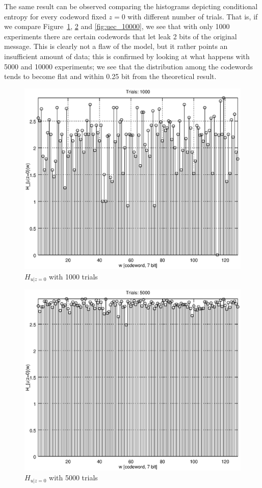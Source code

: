 \documentclass[a4paper,12pt,titlepage]{article}
\begin{document}
The same result can be observed comparing the histograms depicting conditional
entropy for every codeword fixed $z=0$ with different number of trials. That
is, if we compare Figure~\ref{fig:uec_1000}, \ref{fig:uec_5000} and
\ref{fig:uec_10000}, we see that with only 1000 experiments there are certain
codewords that let leak 2 bits of the original message. This is clearly not a
flaw of the model, but it rather points an insufficient amount of data; this is
confirmed by looking at what happens with 5000 and 10000 experiments; we see
that the distribution among the codewords tends to become flat and within 0.25
bit from the theoretical result.

\begin{figure}[h]
  \centering
  \includegraphics[scale=0.8]{uec_1000.eps}
  \caption{$H_{u|z=0}$ with 1000 trials}
  \label{fig:uec_1000}
\end{figure}

\begin{figure}[h]
  \centering
  \includegraphics[scale=0.8]{uec_5000.eps}
  \caption{$H_{u|z=0}$ with 5000 trials}
  \label{fig:uec_5000}
\end{figure}
\end{document}
